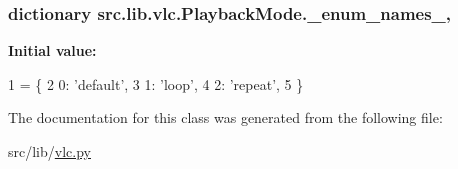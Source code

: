 \subsubsection[{\+\_\+enum\+\_\+names\+\_\+}]{\setlength{\rightskip}{0pt plus 5cm}dictionary src.\+lib.\+vlc.\+Playback\+Mode.\+\_\+enum\+\_\+names\+\_\+\hspace{0.3cm}{\ttfamily [static]}, {\ttfamily [private]}}\label{classsrc_1_1lib_1_1vlc_1_1PlaybackMode_a0cd4cf4af9191357f19a9d0fb1246d06}
{\bfseries Initial value\+:}
\begin{DoxyCode}
1 = \{
2         0: \textcolor{stringliteral}{'default'},
3         1: \textcolor{stringliteral}{'loop'},
4         2: \textcolor{stringliteral}{'repeat'},
5     \}
\end{DoxyCode}


The documentation for this class was generated from the following file\+:\begin{DoxyCompactItemize}
\item 
src/lib/\hyperlink{vlc_8py}{vlc.\+py}\end{DoxyCompactItemize}
